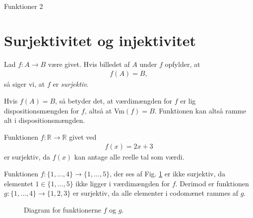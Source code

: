 \begin{center}
\Huge
Funktioner 2
\end{center}
\section*{Surjektivitet og injektivitet}

\begin{defn}
Lad $f:A \to B$ være givet. Hvis billedet af $A$ under $f$ opfylder, at 
\begin{align*}
f(A) = B, 
\end{align*}
så siger vi, at $f$ er \textit{surjektiv}. 
\end{defn}
Hvis $f(A) = B$, så betyder det, at værdimængden for $f$ er lig dispositionsmængden for $f$, altså at Vm$(f) = B.$ Funktionen kan altså ramme alt i dispositionsmængden. 
\begin{exa}
Funktionen $f:\mathbb{R} \to \mathbb{R}$ givet ved
\begin{align*}
f(x) = 2x+3
\end{align*}
er surjektiv, da $f(x)$ kan antage alle reelle tal som værdi.
\end{exa}
\begin{exa}
Funktionen $f:\{1,\hdots,4\} \to \{1,\hdots,5\}$, der ses af Fig. \ref{fig:ikkesur} er ikke surjektiv, da elementet $1\in \{1,\hdots,5\}$ ikke ligger i værdimængden for $f$. Derimod er funktionen $g: \{1,\hdots,4\} \to \{1,2,3\}$ er surjektiv, da alle elementer i codomænet rammes af $g$.
\begin{figure}[H]
\centering
{}
\caption{Diagram for funktionerne $f$ og $g$.}
\label{fig:ikkesur}
\end{figure}
\end{exa}

